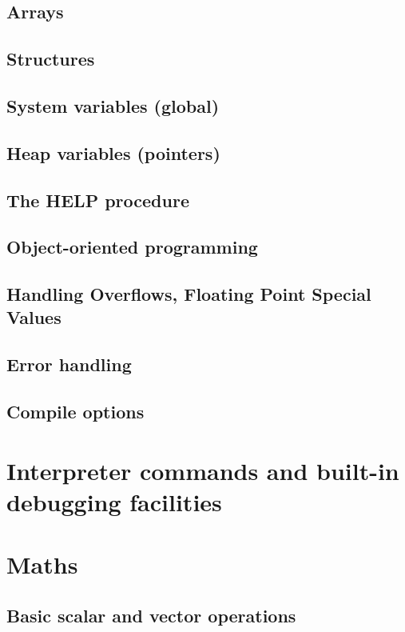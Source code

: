 \documentclass[10pt,titleauthor,openany]{mwbk}
\begin{document}
  \section{Arrays}
  
  \section{Structures}
  \section{System variables (global)}
  \section{Heap variables (pointers)}
  \section{The HELP procedure}
  \section{Object-oriented programming}
  
  \section{Handling Overflows, Floating Point Special Values}
  \section{Error handling}
  
  \section{Compile options}

  \chapter{Interpreter commands and built-in debugging facilities}
  

  \chapter{Maths}

  \section{Basic scalar and vector operations}
  
\end{document}
